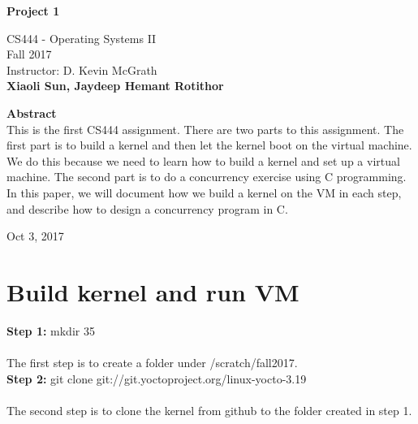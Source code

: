 \documentclass[10pt,letterpaper]{article}
\begin{document}
\begin{titlepage}
\begin{center}
    \Huge
    \textbf{Project 1}
    
    \vspace{0.5in}
    \large
    CS444 - Operating Systems II\\
    
    \vspace{0.2in}
    \large
    Fall 2017\\
    
    \vspace{0.2in}
    \large
    Instructor: D. Kevin McGrath\\
    
    \vspace{0.2in}
    \textbf{Xiaoli Sun, Jaydeep Hemant Rotithor}
    
    \vspace{0.5in}
    \textbf{Abstract}\\
    \vspace{0.2in}
    This is the first CS444 assignment. There are two parts to this assignment. The first part is to build a kernel and then let the kernel boot on the virtual machine. We do this because we need to learn how to build a kernel and set up a virtual machine. The second part is to do a concurrency exercise using C programming. In this paper, we will document how we build a kernel on the VM in each step, and describe how to design a concurrency program in C. 
    
    \vspace{0.3in}
    \vfill
    
    Oct 3, 2017

\end{center}
\end{titlepage}




\newpage
\section{Build kernel and run VM}

\textbf{}

\textbf{Step 1:}
mkdir 35\\ \\
The first step is to create a folder under /scratch/fall2017.\\


\textbf{Step 2:}
git clone git://git.yoctoproject.org/linux-yocto-3.19 \\ \\
The second step is to clone the kernel from github to the folder created in step 1.\\
\end{document}
